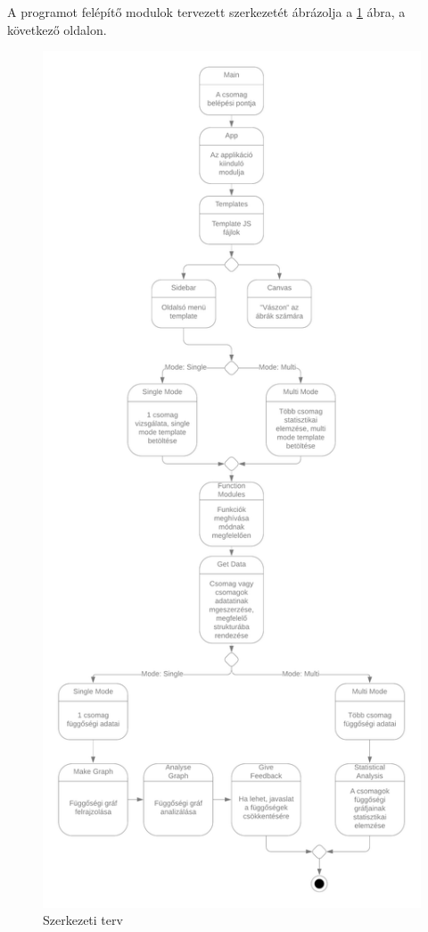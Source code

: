 \noindent A programot felépítő modulok tervezett szerkezetét ábrázolja a \ref{fig:struct_plan} ábra, a következő oldalon.

\begin{figure}[!h]
	\centering
	\includegraphics[scale=0.18]{images/struct_plan.png}
	\caption{Szerkezeti terv}
	\label{fig:struct_plan}
\end{figure}


 
